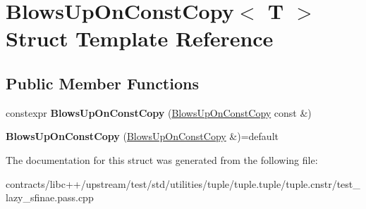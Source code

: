 \hypertarget{struct_blows_up_on_const_copy}{}\section{Blows\+Up\+On\+Const\+Copy$<$ T $>$ Struct Template Reference}
\label{struct_blows_up_on_const_copy}
\subsection*{Public Member Functions}
\begin{DoxyCompactItemize}
\item 
\mbox{\label{struct_blows_up_on_const_copy_afd55624aa10ac762fa1c517a7e46b651}} 
constexpr {\bfseries Blows\+Up\+On\+Const\+Copy} (\mbox{\hyperlink{struct_blows_up_on_const_copy}{Blows\+Up\+On\+Const\+Copy}} const \&)
\item 
\mbox{\label{struct_blows_up_on_const_copy_a7b40051542785bf5bc9669399196d837}} 
{\bfseries Blows\+Up\+On\+Const\+Copy} (\mbox{\hyperlink{struct_blows_up_on_const_copy}{Blows\+Up\+On\+Const\+Copy}} \&)=default
\end{DoxyCompactItemize}


The documentation for this struct was generated from the following file\+:\begin{DoxyCompactItemize}
\item 
contracts/libc++/upstream/test/std/utilities/tuple/tuple.\+tuple/tuple.\+cnstr/test\+\_\+lazy\+\_\+sfinae.\+pass.\+cpp\end{DoxyCompactItemize}
